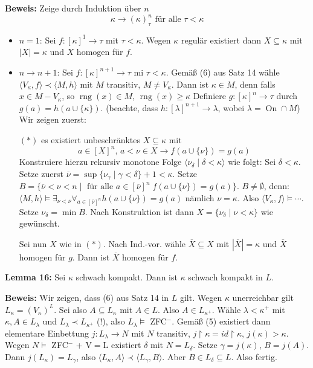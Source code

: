 \documentclass[a4paper,fontsize=11pt]{scrartcl}
\newcommand{\rng}{\operatorname{rng}}
\newcommand{\On}{\operatorname{On}}
\begin{document}
  {\bf Beweis:} Zeige durch Induktion über $n$ 
    $$\kappa \to (\kappa)^n_{\tau} \mbox{ für alle } \tau<\kappa$$
    \begin{itemize}
      \item $n=1$: Sei $f\colon [\kappa]^1\to \tau$ mit $\tau<\kappa$.
         Wegen $\kappa$ regulär existiert dann $X\subseteq \kappa$ mit $|X| = \kappa$ und $X$ homogen für $f$.
      \item $n\to n+1$: Sei $f\colon [\kappa]^{n+1}\to \tau$ mi $\tau<\kappa$.
         Gemäß (6) aus Satz 14 wähle $\langle V_{\kappa}, f\rangle \prec \langle M, h\rangle$
         mit $M$ transitiv, $M\neq V_{\kappa}$.
         Dann ist $\kappa\in M$, denn falls $x\in M-V_{\kappa}$, so $\rng(x)\in M$, $\rng(x)\ge\kappa$
         Definiere $g\colon [\kappa]^n\to\tau$ durch $g(a) = h(a\cup\{\kappa\})$.
         (beachte, dass $h\colon [\lambda]^{n+1}\to\lambda$, wobei $\lambda = \On \cap M$)
         Wir zeigen zuerst:
         
         $(*)$ es existiert unbeschränktes $X\subseteq \kappa$ mit 
           $$a\in [X]^n \mbox{, } a<\nu\in X\to f(a\cup\{\nu\}) = g(a)$$
           Konstruiere hierzu rekursiv monotone Folge $\langle \nu_{\delta}\mid \delta<\kappa\rangle$ wie folgt:
           Sei $\delta<\kappa$. 
           Setze zuerst $\overline\nu = \sup\{\nu_{\gamma}\mid \gamma <\delta\} + 1 <\kappa$.
           Setze $B = \{ \overline\nu < \nu < n \mid \mbox{ für alle } a\in [\overline\nu]^n \; f(a\cup\{\nu\})=g(a)\}$.
           $B\neq \emptyset$, denn: $\langle M, h\rangle\models \exists_{\nu<\overline\nu} \forall_{a\in [\overline\nu]^n} h(a\cup \{\nu\}) = g(a)$
           nämlich $\nu = \kappa$.
           Also $\langle V_{\kappa}, f\rangle \models \cdots$.
           Setze $\nu_{\delta} = \min B$.
           Nach Konstruktion ist dann $X=\{ \nu_{\delta}\mid \nu<\kappa\}$ wie gewünscht.
         
         Sei nun $X$ wie in $(*)$.
         Nach Ind.-vor. wähle $\overline X\subseteq X$ mit $|\overline X| = \kappa$ und $\overline X$ homogen für $g$.
         Dann ist $\overline X$ homogen für $f$.
    \end{itemize}

{\bf Lemma 16:} Sei $\kappa$ schwach kompakt. Dann ist $\kappa$ schwach kompakt in $L$.

  {\bf Beweis:} Wir zeigen, dass (6) aus Satz 14 in $L$ gilt.
  Wegen $\kappa$ unerreichbar gilt $L_{\kappa} = (V_{\kappa})^L$.
  Sei also $A\subseteq L_{\kappa}$ mit $A\in L$.
  Also $A\in L_{\kappa^+}$.
  Wähle $\lambda<\kappa^+$ mit $\kappa, A\in L_{\lambda}$ und $L_{\lambda}\prec L_{\kappa^+}$ (!), also $L_{\lambda}\models$ ZFC$^-$.
  Gemäß (5) existiert dann elementare Einbettung $j\colon L_{\lambda} \to N$ mit $N$ transitiv, 
  $j\upharpoonright\kappa = id\upharpoonright\kappa$, $j(\kappa)>\kappa$.
  Wegen $N\models$ ZFC$^-$ + V$=$L existiert $\delta$ mit $N=L_{\delta}$.
  Setze $\gamma =j(\kappa)$, $B=j(A)$.
  Dann $j(L_{\kappa})=L_{\gamma}$, also $\langle L_{\kappa},A\rangle\prec \langle L_{\gamma}, B\rangle$.
  Aber $B\in L_{\delta} \subseteq L$.
  Also fertig.
  
\end{document}
